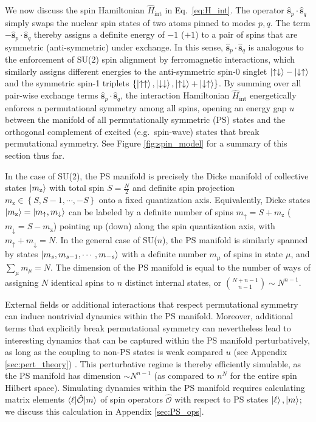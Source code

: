 \documentclass[aps,pra,nofootinbib,twocolumn,superscriptaddress]{revtex4-2}
\renewcommand{\t}{\text} %
\renewcommand{\set}[1]{\left\{#1\right\}} %
\newcommand{\bk}{\braket} %
\renewcommand{\v}{\bm} %
\newcommand{\1}{\mathds{1}}
\newcommand{\s}{\hat s}
\renewcommand{\H}{\hat H}
\renewcommand{\O}{\hat{\mathcal{O}}}
\newcommand{\up}{\uparrow}
\newcommand{\dn}{\downarrow}
\newcommand{\z}{\text{z}}
\begin{document}
We now discuss the spin Hamiltonian $\H_{\t{int}}$ in Eq.~\eqref{eq:H_int}.
The operator $\v\s_p\cdot\v\s_q$ simply swaps the nuclear spin states of two atoms pinned to modes $p,q$.
The term $-\v\s_p\cdot\v\s_q$ thereby assigns a definite energy of $-1$ ($+1$) to a pair of spins that are symmetric (anti-symmetric) under exchange.
In this sense, $\v\s_p\cdot\v\s_q$ is analogous to the enforcement of SU($2$) spin alignment by ferromagnetic interactions, which similarly assigns different energies to the anti-symmetric spin-0 singlet $\ket{\up\dn}-\ket{\dn\up}$ and the symmetric spin-1 triplets $\set{\ket{\up\up},\ket{\dn\dn},\ket{\up\dn}+\ket{\dn\up}}$.
By summing over all pair-wise exchange terms $\v\s_p\cdot\v\s_q$, the interaction Hamiltonian $\H_{\t{int}}$ energetically enforces a permutational symmetry among all spins, opening an energy gap $u$ between the manifold of all permutationally symmetric (PS) states and the orthogonal complement of excited (e.g.~spin-wave) states that break permutational symmetry.
See Figure \ref{fig:spin_model} for a summary of this section thus far.

In the case of SU($2$), the PS manifold is precisely the Dicke manifold of collective states $\ket{m_\z}$ with total spin $S=\frac{N}{2}$ and definite spin projection $m_\z\in\set{S,S-1,\cdots,-S}$ onto a fixed quantization axis.
Equivalently, Dicke states $\ket{m_\z}=\ket{m_\up,m_\dn}$ can be labeled by a definite number of spins $m_\up=S+m_\z$ ($m_\dn=S-m_\z$) pointing up (down) along the spin quantization axis, with $m_\up+m_\dn=N$.
In the general case of SU($n$), the PS manifold is similarly spanned by states $\ket{m_s,m_{s-1},\cdots,m_{-s}}$ with a definite number $m_\mu$ of spins in state $\mu$, and $\sum_\mu m_\mu=N$.
The dimension of the PS manifold is equal to the number of ways of assigning $N$ identical spins to $n$ distinct internal states, or ${N+n-1 \choose n-1} \sim N^{n-1}$.

External fields or additional interactions that respect permutational symmetry can induce nontrivial dynamics within the PS manifold.
Moreover, additional terms that explicitly break permutational symmetry can nevertheless lead to interesting dynamics that can be captured within the PS manifold perturbatively, as long as the coupling to non-PS states is weak compared $u$ (see Appendix \ref{sec:pert_theory}) \cite{bravyi2011schrieffer}.
This perturbative regime is thereby efficiently simulable, as the PS manifold has dimension $\sim N^{n-1}$ (as compared to $n^N$ for the entire spin Hilbert space).
Simulating dynamics within the PS manifold requires calculating matrix elements $\bk{\ell|\O|m}$ of spin operators $\O$ with respect to PS states $\ket\ell,\ket{m}$; we discuss this calculation in Appendix \ref{sec:PS_ops}.
\end{document}
